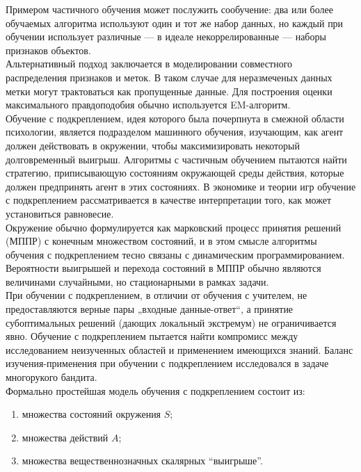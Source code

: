 Примером частичного обучения может послужить сообучение: два или более обучаемых алгоритма используют один и тот же набор данных, но каждый при обучении использует различные — в идеале некоррелированные — наборы признаков объектов. \\

Альтернативный подход заключается в моделировании совместного распределения признаков и меток. В таком случае для неразмеченых данных метки могут трактоваться как пропущенные данные. Для построения оценки максимального правдоподобия обычно используется EM-алгоритм. \\

Обучение с подкреплением, идея которого была почерпнута в смежной области психологии, является подразделом машинного обучения, изучающим, как агент должен действовать в окружении, чтобы максимизировать некоторый долговременный выигрыш. Алгоритмы с частичным обучением пытаются найти стратегию, приписывающую состояниям окружающей среды действия, которые должен предпринять агент в этих состояниях. В экономике и теории игр обучение с подкреплением рассматривается в качестве интерпретации того, как может установиться равновесие. \\

Окружение обычно формулируется как марковский процесс принятия решений (МППР) с конечным множеством состояний, и в этом смысле алгоритмы обучения с подкреплением тесно связаны с динамическим программированием. Вероятности выигрышей и перехода состояний в МППР обычно являются величинами случайными, но стационарными в рамках задачи. \\

При обучении с подкреплением, в отличии от обучения с учителем, не предоставляются верные пары „входные данные-ответ“, а принятие субоптимальных решений (дающих локальный экстремум) не ограничивается явно. Обучение с подкреплением пытается найти компромисс между исследованием неизученных областей и применением имеющихся знаний. Баланс изучения-применения при обучении с подкреплением исследовался в задаче многорукого бандита. \\

Формально простейшая модель обучения с подкреплением состоит из: \\

\begin{enumerate}
  \item множества состояний окружения $S$;
  \item множества действий $A$;
  \item множества вещественнозначных скалярных ``выигрыше''.
\end{enumerate}
\

